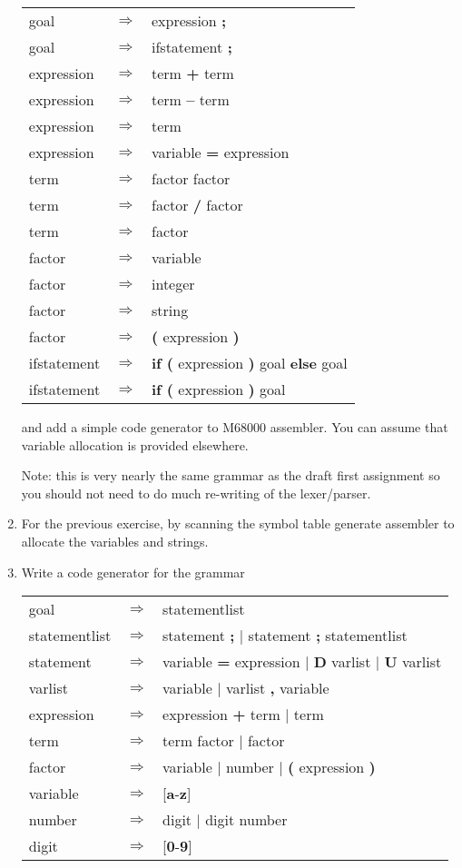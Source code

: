 \begin{enumerate}
\begin{tabular}{lcl}
goal & $\Rightarrow$ & expression {\bf ;} \\
goal & $\Rightarrow$ & ifstatement {\bf ;} \\
expression & $\Rightarrow$ & term {\bf +} term \\
expression & $\Rightarrow$ & term {\bf --} term \\
expression & $\Rightarrow$ & term \\
expression & $\Rightarrow$ & variable {\bf =} expression \\
term & $\Rightarrow$ & factor {\bf *} factor \\
term & $\Rightarrow$ & factor {\bf /} factor \\
term & $\Rightarrow$ & factor \\
factor & $\Rightarrow$ & variable \\
factor & $\Rightarrow$ & integer \\
factor & $\Rightarrow$ & string \\
factor & $\Rightarrow$ & {\bf (} expression {\bf )} \\
ifstatement & $\Rightarrow$ & {\bf if (} expression  {\bf )} goal {\bf else} goal\\
ifstatement & $\Rightarrow$ & {\bf if (} expression  {\bf )} goal
\end{tabular}

 and add a simple code generator to M68000 assembler.  You can assume
 that variable allocation is provided elsewhere.

Note: this is very nearly the same grammar as the draft first
assignment so you should not need to do much re-writing of the lexer/parser.

\item For the previous exercise, by scanning the symbol table generate
  assembler to allocate the variables and strings.

\item Write a code generator for the grammar

\begin{tabular}{lcl}
goal & $\Rightarrow$ & statementlist \\
statementlist & $\Rightarrow$ & statement {\bf ;} $|$ statement {\bf ;} statementlist \\
statement & $\Rightarrow$ & variable {\bf =} expression $|$ {\bf D} varlist $|$ {\bf U} varlist \\
varlist & $\Rightarrow$ & variable $|$ varlist {\bf ,} variable \\
expression & $\Rightarrow$ & expression {\bf +} term $|$ term \\
term & $\Rightarrow$ & term {\bf *} factor $|$ factor \\
factor & $\Rightarrow$ & variable $|$  number $|$ {\bf (} expression {\bf )} \\
variable & $\Rightarrow$ & [{\bf a}-{\bf z}] \\
number & $\Rightarrow$ & digit $|$ digit number \\
digit & $\Rightarrow$ & [{\bf 0}-{\bf 9}]
\end{tabular}


\end{enumerate}
